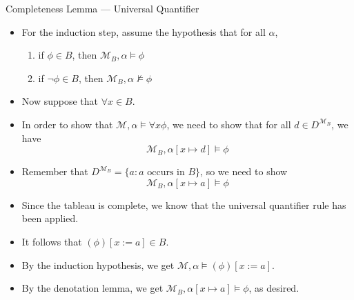 \begin{frame}{Completeness Lemma --- Universal Quantifier}

  \begin{itemize}
  \item For the induction step, assume the hypothesis that for all
    $\alpha$,
     \begin{enumerate}[1.]

                      \item if $\phi\in B$, then
                        $\mathcal{M}_B,\alpha\vDash\phi$

                        \item if $\neg\phi\in B$, then
                          $\mathcal{M}_B,\alpha\nvDash\phi$ 
                      
                        \end{enumerate}

                      \item Now suppose that $\forall x\in B$.

                        \item In order to show that
                          $\mathcal{M},\alpha\vDash\forall x\phi$, we
                          need to show that for all $d\in
                          D^{\mathcal{M}_B}$, we
                          have \[\mathcal{M}_B,\alpha[x\mapsto
                            d]\vDash \phi\]
                          \item Remember that $D^{\mathcal{M}_B}=\{a:
                            a\text{ occurs in }
                            B\}$, so we need to show \[\mathcal{M}_B,\alpha[x\mapsto
                            a]\vDash \phi\]

                              \item Since the tableau is complete, we
                                know that the universal quantifier
                                rule has been applied.

                                \item It follows that $(\phi)[x:=a]\in
                                  B$.

                                  \item By the induction hypothesis,
                                    we get $\mathcal{M},\alpha\vDash
                                    (\phi)[x:=a]$.

                                    \item By the denotation lemma, we
                                      get $\mathcal{M}_B,\alpha[x\mapsto
                            a]\vDash \phi$, as desired.
                        
  \end{itemize}
  
\end{frame}


